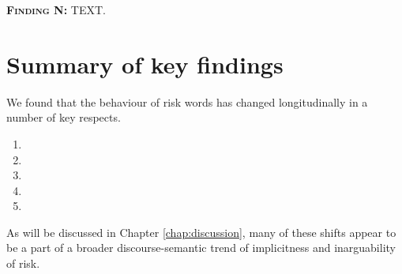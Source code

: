   \noindent\colorbox{yellow!20}{%
  \parbox{1\textwidth}{%
  \textsc{\textbf{Finding N:}} TEXT.}}

  \section{Summary of key findings}

  We found that the behaviour of risk words has changed longitudinally in a number of key respects.

  \begin{enumerate}
  	\item 
  	\item 
  	\item 
  	\item 
  	\item 
  \end{enumerate}

  As will be discussed in Chapter \ref{chap:discussion}, many of these shifts appear to be a part of a broader discourse-semantic trend of implicitness and inarguability of risk. 


%

